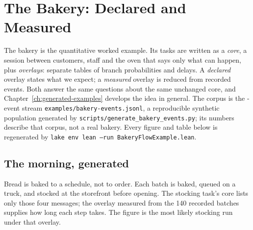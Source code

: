 \chapter{The Bakery: Declared and Measured}
\label{ch:bakery}


\makeatletter
\newenvironment{bakeryfigure}{\par\medskip\noindent\begin{minipage}{\linewidth}\centering\def\@captype{figure}}{\end{minipage}\par\medskip}
\newenvironment{bakerytable}{\par\medskip\noindent\begin{minipage}{\linewidth}\centering\def\@captype{table}}{\end{minipage}\par\medskip}
\makeatother

The bakery is the quantitative worked example. Its tasks are written as a
\emph{core}, a session between customers, staff and the oven that says only
what can happen, plus \emph{overlays}: separate
tables of branch probabilities and delays. A \emph{declared} overlay states
what we expect; a \emph{measured} overlay is reduced from recorded events.
Both answer the same questions about the same unchanged core, and
Chapter~\ref{ch:generated-examples} develops the idea in general. The
corpus is the \BakeryEvents{}-event stream \texttt{examples/bakery-events.jsonl},
a reproducible synthetic population generated by
\texttt{scripts/generate\_bakery\_events.py}; its numbers describe that corpus,
not a real bakery. Every figure and table below is regenerated by
\texttt{lake env lean --run BakeryFlowExample.lean}.

\section{The morning, generated}

Bread is baked to a schedule, not to order. Each batch is baked, queued on a
truck, and stocked at the storefront before opening. The stocking task's core
lists only those four messages; the overlay measured from the 140 recorded
batches supplies how long each step takes. The figure is the most likely
stocking run under that overlay.

\begin{bakeryfigure}
\caption{One batch from oven to shelf, with mean step times measured from the
corpus.}
\label{fig:bakery-morning}
\end{bakeryfigure}

